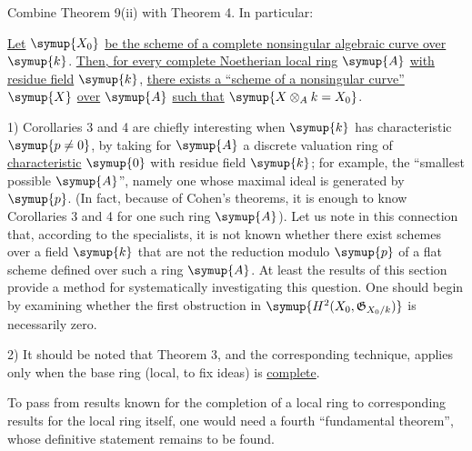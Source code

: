 Combine Theorem 9(ii) with Theorem 4. In particular:

 \uline{Let} $\symup{X_0}$ \uline{be the scheme of a complete nonsingular
algebraic curve over} $\symup{k}$. \uline{Then, for every complete Noetherian local ring} $\symup{A}$
\uline{with residue field} $\symup{k}$, \uline{there exists a “scheme of a nonsingular curve”} $\symup{X}$ \uline{over} $\symup{A}$ \uline{such
that} $\symup{X\otimes_A k=X_0}$.


1) Corollaries 3 and 4 are chiefly interesting when $\symup{k}$ has characteristic
$\symup{p\ne0}$, by taking for $\symup{A}$ a discrete valuation ring of \uline{characteristic} $\symup{0}$
with residue field $\symup{k}$; for example, the “smallest possible $\symup{A}$”, namely one
whose maximal ideal is generated by $\symup{p}$. (In fact, because of Cohen's
theorems, it is enough to know Corollaries 3 and 4 for one such ring $\symup{A}$). Let
us note in this connection that, according to the specialists, it is not
known whether there exist schemes over a field $\symup{k}$ that are not the reduction
modulo $\symup{p}$ of a flat scheme defined over such a ring $\symup{A}$. At least the results
of this section provide a method for systematically investigating this
question. One should begin
by examining whether the first obstruction in $\symup{H^2(X_0,\mathfrak G_{X_0/k})}$ is
necessarily zero.

2) It should be noted that Theorem 3, and the corresponding technique, applies
only when the base ring (local, to fix ideas) is \uline{complete}.

To pass from results known for the completion of a local ring to corresponding
results for the local ring itself, one would need a fourth “fundamental
theorem”, whose definitive statement remains to be found.


